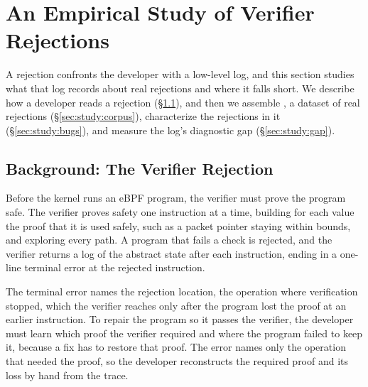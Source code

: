 \section{An Empirical Study of Verifier Rejections}
\label{sec:study}

A rejection confronts the developer with a low-level log, and this section studies what that log records about real rejections and where it falls short.
We describe how a developer reads a rejection (\S\ref{sec:study:verifier}), and then we assemble \empiricalset, a dataset of real rejections (\S\ref{sec:study:corpus}), characterize the rejections in it (\S\ref{sec:study:bugs}), and measure the log's diagnostic gap (\S\ref{sec:study:gap}).

\subsection{Background: The Verifier Rejection}
\label{sec:study:verifier}

Before the kernel runs an eBPF program, the verifier must prove the program safe.
The verifier proves safety one instruction at a time, building for each value the proof that it is used safely, such as a packet pointer staying within bounds, and exploring every path.
A program that fails a check is rejected, and the verifier returns a log of the abstract state after each instruction, ending in a one-line terminal error at the rejected instruction.

The terminal error names the rejection location, the operation where verification stopped, which the verifier reaches only after the program lost the proof at an earlier instruction.
To repair the program so it passes the verifier, the developer must learn which proof the verifier required and where the program failed to keep it, because a fix has to restore that proof.
The error names only the operation that needed the proof, so the developer reconstructs the required proof and its loss by hand from the trace.

